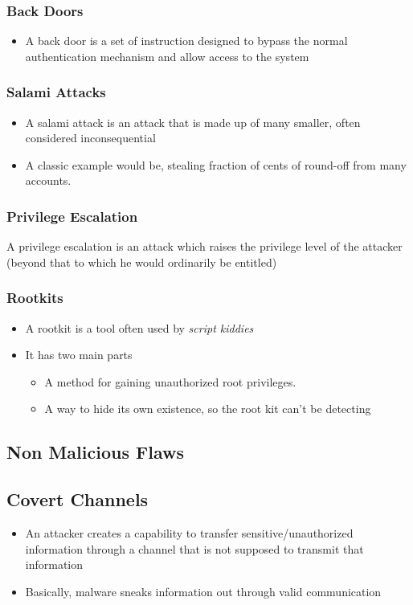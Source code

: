 \documentclass[twoside]{article}
\begin{document}
\subsubsection{Back Doors}
\begin{itemize}
\item A back door is a set of instruction designed to bypass the normal authentication mechanism and allow access to the system 
\end{itemize}

\subsubsection{Salami Attacks}
\begin{itemize}
\item A salami attack is an attack that is made up of many smaller, often considered inconsequential
\item A classic example would be, stealing fraction of cents of round-off from many accounts.
\end{itemize}

\subsubsection{Privilege Escalation}

A privilege escalation is an attack which raises the
privilege level of the attacker (beyond that to
which he would ordinarily be entitled)

\subsubsection{Rootkits}
\begin{itemize}
\item A rootkit is a tool often used by \textit{script kiddies}
\item It has two main parts
\begin{itemize}
\item A method for gaining unauthorized root privileges.
\item A way to hide its own existence, so the root kit can't be detecting 
\end{itemize}
\end{itemize}

\subsection{Non Malicious Flaws}
\subsection{Covert Channels}
\begin{itemize}
\item An attacker creates a capability to transfer
sensitive/unauthorized information through a
channel that is not supposed to transmit that
information
\item Basically, malware sneaks information out through valid communication
\end{itemize}
\end{document}
